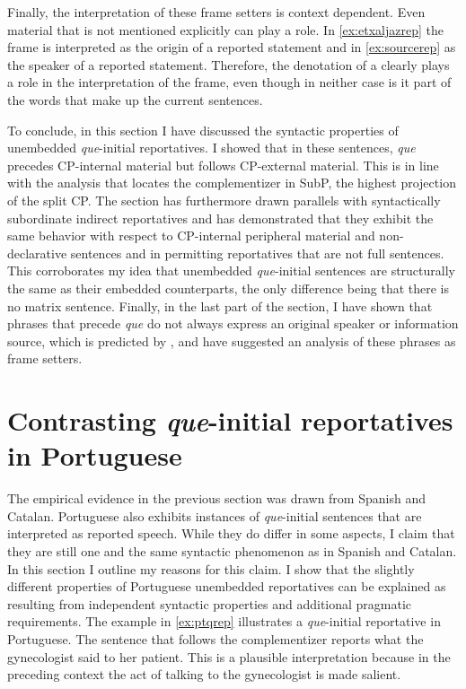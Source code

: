 Finally, the interpretation of these frame setters is   context dependent. Even material that is not mentioned explicitly can play a role.  In   \eqref{ex:etxaljazrep} the frame is interpreted as the origin of a reported statement and in   \eqref{ex:sourcerep} as the speaker of a reported statement. Therefore,  the denotation of a \emph{} clearly plays a role in the interpretation of the frame, even though in neither case  is it part of the words that make up the current sentences. 

To conclude, in this section I have discussed the syntactic properties of unembedded \emph{que}-initial reportatives. I  showed that in these sentences, \emph{que}   precedes  CP-internal material but follows CP-external material. This is in line with the analysis that locates the complementizer in SubP, the highest projection of the split CP. The section has furthermore drawn  parallels with syntactically subordinate indirect reportatives and has demonstrated that they exhibit the same behavior with respect to CP-internal peripheral material and non-declarative sentences and in permitting reportatives that are not full sentences. This corroborates my idea that unembedded \emph{que}-initial sentences are  structurally the same as their embedded counterparts, the only difference being that there is no matrix sentence.  Finally, in the last part of the section, I have  shown that phrases that precede \emph{que} do not always express an original speaker or information source, which is predicted by \citet{Corr2016}, and  have suggested an analysis of these phrases as frame setters.


\section{Contrasting \emph{que}-initial reportatives in Portuguese}\label{sec:insubcross}\largerpage



The empirical evidence in the previous section was drawn from Spanish and Catalan. Portuguese also exhibits instances of \emph{que}-initial sentences  that are interpreted as reported speech. While they do differ in some aspects,  I  claim that  they are still one and the same syntactic phenomenon as in Spanish and Catalan.  In this section I outline my reasons for this claim. I show that the slightly different properties of Portuguese unembedded reportatives can be explained as resulting from independent syntactic properties and  additional pragmatic requirements. The example in \eqref{ex:ptqrep} illustrates a \emph{que}-initial reportative in Portuguese. The sentence that follows the complementizer reports what the gynecologist said to her patient. This is a plausible interpretation because in the preceding context the act of talking to the gynecologist is made salient. 


